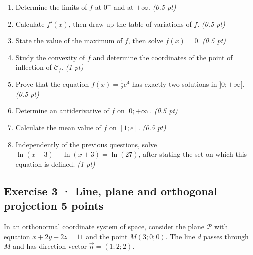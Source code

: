 \begin{enumerate}

\item Determine the limits of $f$ at $0^+$ and at $+\infty$. \hfill\textit{(0.5 pt)}

\item Calculate $f' (x)$, then draw up the table of variations of $f$. \hfill\textit{(0.5 pt)}

\item State the value of the maximum of $f$, then solve $f(x)=0$. \hfill\textit{(0.5 pt)}

\item Study the convexity of $f$ and determine the coordinates of the point of inflection of $\mathcal C_f$. \hfill\textit{(1 pt)}

\item Prove that the equation $f(x)=\frac12 e^{4}$ has exactly two solutions in $]0;+\infty[$. \hfill\textit{(0.5 pt)}

\item Determine an antiderivative of $f$ on $]0;+\infty[$. \hfill\textit{(0.5 pt)}

\item Calculate the mean value of $f$ on $[1;e]$. \hfill\textit{(0.5 pt)}

\item Independently of the previous questions, solve $\ln(x-3)+\ln(x+3)=\ln(27)$, after stating the set on which this equation is defined. \hfill\textit{(1 pt)}

\end{enumerate}

\clearpage{}\par

\subsection*{Exercise 3 · Line, plane and orthogonal projection \hfill 5 points}In an orthonormal coordinate system of space, consider the plane $\mathcal P$ with equation $x+2y+2z=11$ and the point $M(3;0;0)$. The line $d$ passes through $M$ and has direction vector $\vec n=(1;2;2)$.

